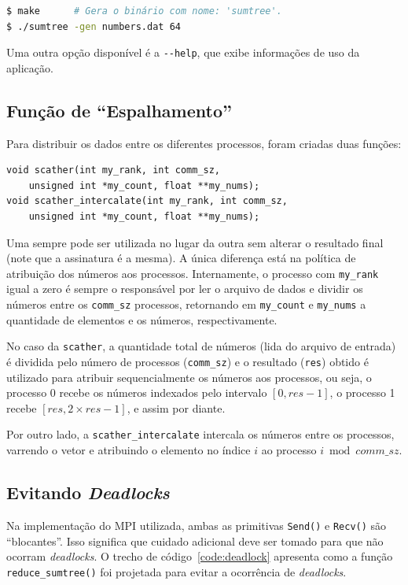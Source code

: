 \documentclass[12pt,a4paper]{article}
\begin{document}
\begin{lstlisting}[language=bash]
$ make      # Gera o binário com nome: 'sumtree'.
$ ./sumtree -gen numbers.dat 64
\end{lstlisting}

Uma outra opção disponível é a \texttt{-{}-help}, que exibe informações de uso da
aplicação.


\subsection{Função de ``Espalhamento''}
Para distribuir os dados entre os diferentes processos, foram criadas duas
funções:

\begin{lstlisting}[style=c, numbers=none]
void scather(int my_rank, int comm_sz,
    unsigned int *my_count, float **my_nums);
void scather_intercalate(int my_rank, int comm_sz,
    unsigned int *my_count, float **my_nums);
\end{lstlisting}

Uma sempre pode ser utilizada no lugar da outra sem alterar o resultado final
(note que a assinatura é a mesma). A única diferença está na política de
atribuição dos números aos processos. Internamente, o processo com
\texttt{my\_rank} igual a zero é sempre o responsável por ler o arquivo de dados
e dividir os números entre os \texttt{comm\_sz} processos, retornando em
\texttt{my\_count} e \texttt{my\_nums} a quantidade de elementos e os números,
respectivamente.

No caso da \texttt{scather}, a quantidade total de números (lida do arquivo de
entrada) é dividida pelo número de processos (\texttt{comm\_sz}) e o resultado
(\texttt{res}) obtido é utilizado para atribuir sequencialmente os números aos
processos, ou seja, o processo 0 recebe os números indexados pelo intervalo $[0,
res - 1]$, o processo 1 recebe $[res, 2 \times res - 1]$, e assim por diante.

Por outro lado, a \texttt{scather\_intercalate} intercala os números entre os
processos, varrendo o vetor e atribuindo o elemento no índice $i$ ao processo $i
\bmod comm\_sz$. 


\subsection{Evitando \textit{Deadlocks}}
Na implementação do MPI utilizada, ambas as primitivas \texttt{Send()} e
\texttt{Recv()} são ``blocantes''. Isso significa que cuidado adicional deve ser
tomado para que não ocorram \textit{deadlocks}. O trecho de
código~\ref{code:deadlock} apresenta como a função \texttt{reduce\_sumtree()}
foi projetada para evitar a ocorrência de \textit{deadlocks}.
\end{document}
